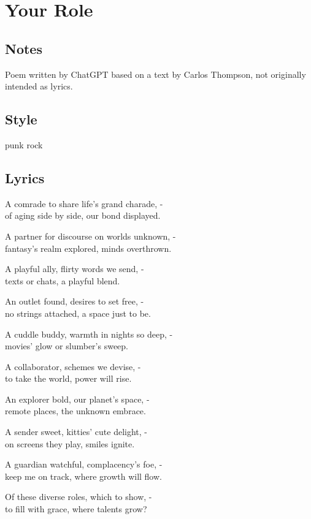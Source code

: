 \section{Your Role}\label{your-role}

\subsection{Notes}\label{notes-2}

Poem written by ChatGPT based on a text by Carlos Thompson, not
originally intended as lyrics.

\subsection{Style}\label{style-2}

punk rock

\subsection{Lyrics}\label{lyrics-2}

A comrade to share life's grand charade, -\\
of aging side by side, our bond displayed.

A partner for discourse on worlds unknown, -\\
fantasy's realm explored, minds overthrown.

A playful ally, flirty words we send, -\\
texts or chats, a playful blend.

An outlet found, desires to set free, -\\
no strings attached, a space just to be.

A cuddle buddy, warmth in nights so deep, -\\
movies' glow or slumber's sweep.

A collaborator, schemes we devise, -\\
to take the world, power will rise.

An explorer bold, our planet's space, -\\
remote places, the unknown embrace.

A sender sweet, kitties' cute delight, -\\
on screens they play, smiles ignite.

A guardian watchful, complacency's foe, -\\
keep me on track, where growth will flow.

Of these diverse roles, which to show, -\\
to fill with grace, where talents grow?

